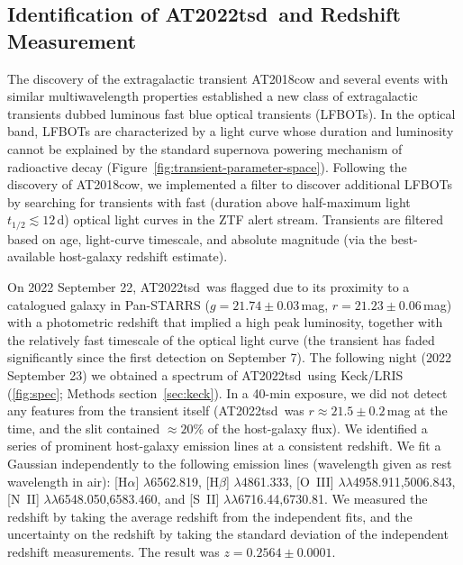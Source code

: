 \documentclass{nature_plusfigure}
\newcommand{\at}{AT2022tsd}
\begin{document}
\begin{methods}

\section{Identification of \at\ and Redshift Measurement}
\label{sec:discovery}

The discovery of the extragalactic transient AT2018cow\cite{Prentice2018} and several events with similar multiwavelength properties\cite{Coppejans2020,Ho2020_Koala,Yao2022,Perley2021} established a new class of extragalactic transients dubbed luminous fast blue optical transients (LFBOTs\cite{Metzger2022}).
In the optical band, LFBOTs are characterized by a light curve whose duration and luminosity cannot be explained by the standard supernova powering mechanism of radioactive decay (Figure~\ref{fig:transient-parameter-space}).
Following the discovery of AT2018cow, we implemented a filter to discover additional LFBOTs by searching for transients with fast (duration above half-maximum light $t_{1/2}\lesssim12\,$d\cite{Drout2014}) optical light curves in the ZTF alert stream\cite{Ho2022_RET}.
Transients are filtered based on age, light-curve timescale, and absolute magnitude (via the best-available host-galaxy redshift estimate).

On 2022 September 22, \at\ was flagged due to its proximity to a catalogued galaxy in Pan-STARRS ($g=21.74\pm0.03$\,mag, $r=21.23\pm0.06$\,mag) with a photometric redshift that implied a high peak luminosity, together with the relatively fast timescale of the optical light curve (the transient has faded significantly since the first detection on September 7).
The following night (2022 September 23) we obtained a spectrum of \at\ using Keck/LRIS (\ref{fig:spec}; Methods section~\ref{sec:keck}).
In a 40-min exposure, we did not detect any features from the transient itself (\at\ was $r\approx21.5\pm0.2$\,mag at the time, and the slit contained $\approx20\%$ of the host-galaxy flux). We identified a series of prominent host-galaxy emission lines at a consistent redshift. We fit a Gaussian independently to the following emission lines (wavelength given as rest wavelength in air): [H$\alpha$] $\lambda$6562.819, [H$\beta$] $\lambda$4861.333, 
 [O~III] $\lambda$$\lambda$4958.911,5006.843, 
  [N~II] $\lambda$$\lambda$6548.050,6583.460, and [S~II] $\lambda\lambda$6716.44,6730.81. 
We measured the redshift by taking the average redshift from the independent fits, and the uncertainty on the redshift by taking the standard deviation of the independent redshift measurements.
The result was $z=0.2564\pm0.0001$.


\end{methods}
\end{document}
